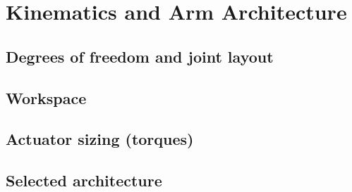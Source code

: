 \chapter{Kinematics and Arm Architecture}
\label{ch:kinematics}
\section{Degrees of freedom and joint layout}

\section{Workspace}

\section{Actuator sizing (torques)}

\section{Selected architecture}
